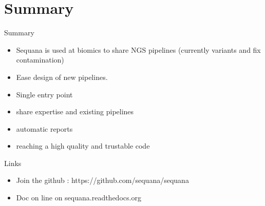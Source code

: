 \documentclass{beamer}
\begin{document}
\section{Summary}

\begin{frame}[fragile]
  \begin{block}{Summary}
    \begin{itemize}
      \item Sequana is used at biomics to share NGS pipelines (currently variants and fix contamination)
      \item Ease design of new pipelines. 
      \item Single entry point
      \item share expertise and existing pipelines
      \item automatic reports
      \item reaching a high quality and trustable code
    \end{itemize}
   \end{block}
 
  \begin{block}{Links}
    \begin{itemize}
      \item Join the github  : https://github.com/sequana/sequana    
      \item Doc on line on sequana.readthedocs.org
    \end{itemize}
  \end{block}
\end{frame}
\end{document}
